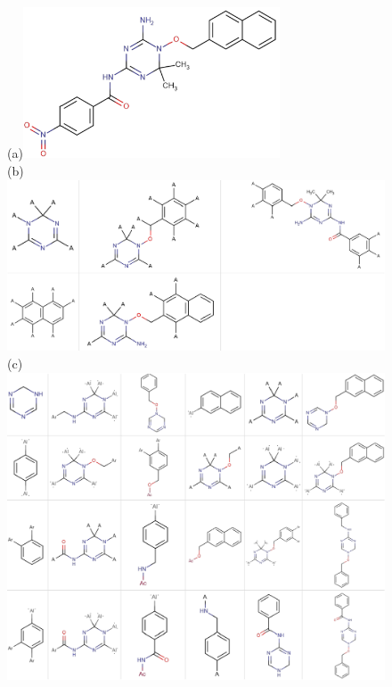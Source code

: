\documentclass[journal=jacsat,biochem,manuscript=article]{achemso}
\begin{document}
\begin{figure}

(a)\includegraphics[width=3in]{fig/tcam1_mol_v2.png}\\
\vspace{0.1in}
(b)\includegraphics[width=5in]{fig/tcam1_RGscaf_v2.png}\\
\vspace{0.1in}
(c)\includegraphics[width=5in]{fig/tcam1_FW_v2.png}

\end{figure}
\end{document}
